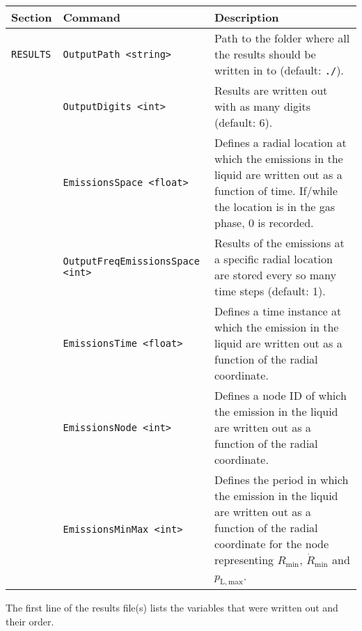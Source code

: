 \noindent
\begin{tabular}{p{} p{} p{}}
    \textbf{Section} &\textbf{Command} & \textbf{Description} 
\vspace{1mm} \\ \hline
{\tt RESULTS} & {\tt OutputPath <string>} & Path to the folder where all the results should be written in to (default: {\tt ./}).\\
& {\tt OutputDigits <int>} & Results are written out with as many digits (default: 6).\\
& {\tt EmissionsSpace <float>} & Defines a radial location at which the emissions in the liquid are written out as a function of time. If/while the location is in the gas phase, $0$ is recorded.\\ 
& {\tt OutputFreqEmissionsSpace <int>} & Results of the emissions at a specific radial location are stored every so many time steps (default: 1).\\ 
& {\tt EmissionsTime <float>} & Defines a time instance at which the emission in the liquid are written out as a function of the radial coordinate.\\ 
& {\tt EmissionsNode <int>} & Defines a node ID of which the emission in the liquid are written out as a function of the radial coordinate.\\ 
& {\tt EmissionsMinMax <int>} & Defines the period in which the emission in the liquid are written out as a function of the radial coordinate for the node representing $R_\mathrm{min}$, $\dot{R}_\mathrm{min}$ and $p_\mathrm{L,max}$.\\ 
 \hline
\end{tabular}

The first line of the results file(s) lists the variables that were written out and their order.